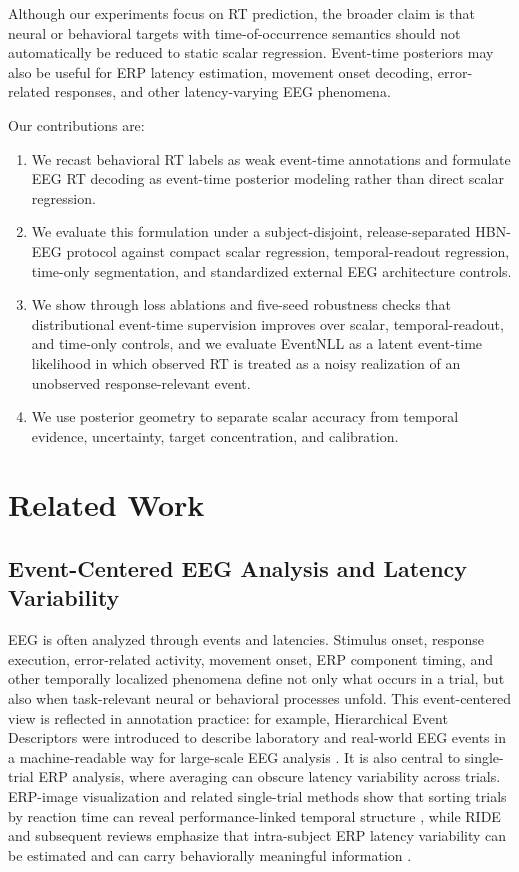 \documentclass[12pt]{article}
\begin{document}
Although our experiments focus on RT prediction, the broader claim is that neural or behavioral targets with time-of-occurrence semantics should not automatically be reduced to static scalar regression. Event-time posteriors may also be useful for ERP latency estimation, movement onset decoding, error-related responses, and other latency-varying EEG phenomena.

Our contributions are:
\begin{enumerate}
    \item We recast behavioral RT labels as weak event-time annotations and formulate EEG RT decoding as event-time posterior modeling rather than direct scalar regression.
    \item We evaluate this formulation under a subject-disjoint, release-separated HBN-EEG protocol against compact scalar regression, temporal-readout regression, time-only segmentation, and standardized external EEG architecture controls.
    \item We show through loss ablations and five-seed robustness checks that distributional event-time supervision improves over scalar, temporal-readout, and time-only controls, and we evaluate EventNLL as a latent event-time likelihood in which observed RT is treated as a noisy realization of an unobserved response-relevant event.
    \item We use posterior geometry to separate scalar accuracy from temporal evidence, uncertainty, target concentration, and calibration.
\end{enumerate}

\section{Related Work}

\subsection{Event-Centered EEG Analysis and Latency Variability}
EEG is often analyzed through events and latencies. Stimulus onset, response execution, error-related activity, movement onset, ERP component timing, and other temporally localized phenomena define not only what occurs in a trial, but also when task-relevant neural or behavioral processes unfold. This event-centered view is reflected in annotation practice: for example, Hierarchical Event Descriptors were introduced to describe laboratory and real-world EEG events in a machine-readable way for large-scale EEG analysis \citep{BigdelyShamlo2016HED}. It is also central to single-trial ERP analysis, where averaging can obscure latency variability across trials. ERP-image visualization and related single-trial methods show that sorting trials by reaction time can reveal performance-linked temporal structure \citep{Jung1998SingleTrialERP}, while RIDE and subsequent reviews emphasize that intra-subject ERP latency variability can be estimated and can carry behaviorally meaningful information \citep{Ouyang2011RIDE,Ouyang2017LatencyReview}.
\end{document}
